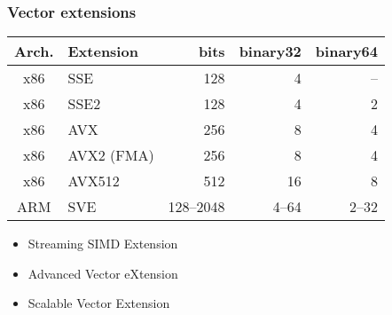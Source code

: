 \documentclass[14pt,aspectratio=169,dvipsnames,table]{beamer}
\begin{document}
\begin{frame}
  \frametitle{Vector extensions}
  \vspace{7pt}
  \centering
  \setlength{\tabcolsep}{12pt}
  \begin{tabular}{clrrr}
    \toprule
    Arch. & Extension   & bits      & binary32 & binary64 \\
    \midrule
    x86 & SSE         &       128 &     4 &     --\\
    x86 & SSE2        &       128 &     4 &     2 \\
    x86 & AVX         &       256 &     8 &     4 \\
    x86 & AVX2 (FMA)  &       256 &     8 &     4 \\
    x86 & AVX512      &       512 &    16 &     8 \\
    ARM & SVE         & 128--2048 & 4--64 & 2--32 \\
    \bottomrule
  \end{tabular}
  \vspace{7pt}
  \begin{itemize}\setlength\itemsep{5pt}
  \item {} Streaming SIMD Extension
  \item {} Advanced Vector eXtension
  \item {} Scalable Vector Extension
  \end{itemize}
\end{frame}
\end{document}
